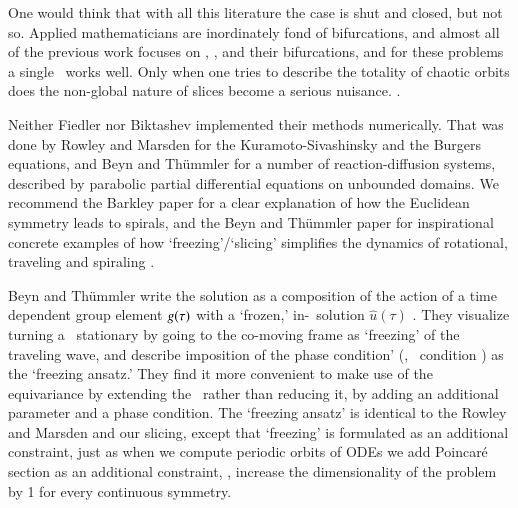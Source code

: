 {One would think that with all this literature the case is shut and closed,
but not so. Applied mathematicians are inordinately fond of bifurcations,
and almost all of the previous work focuses on \eqva, \reqva, and their
bifurcations, and for these problems a single \slice\ works well. Only
when one tries to describe the totality of chaotic orbits does the
non-global nature of slices become a serious nuisance.
    .

Neither Fiedler \etal{} nor Biktashev
\etal{} implemented their methods numerically.
That was done by Rowley and Marsden for the
Kuramoto-Sivashinsky and the
Burgers equations, and Beyn and
Th\"ummler for a number of
reaction-diffusion systems, described by parabolic partial
differential equations on unbounded domains. We recommend the
Barkley paper for a clear explanation of how
the Euclidean symmetry leads to spirals, and the Beyn and
Th\"ummler paper for inspirational concrete
examples of how `freezing'/\-`slicing' simplifies the
dynamics of rotational, traveling and spiraling \reqva.

Beyn and Th\"ummler write the solution as a composition of
the action of a time dependent group element $g(\tau)$ with
a `frozen,' in-\slice\ solution $\hat{u}(\tau)$
. They visualize turning a \reqv\ stationary
by going to the co-moving frame as `freezing' of the
traveling wave, and describe imposition of the phase
condition' (\ie, \slice\ condition ) as the
`freezing ansatz.' They find it more convenient to make use
of the equivariance by extending the \statesp\ rather than
reducing it, by adding an additional parameter and a phase
condition.
The `freezing ansatz' is identical
to the Rowley and Marsden and our
slicing, except that `freezing' is formulated as an
additional constraint, just as when we compute periodic
orbits of ODEs we add Poincar\'e section as an additional
constraint, \ie, increase the dimensionality of the problem
by 1 for every continuous symmetry.

}

